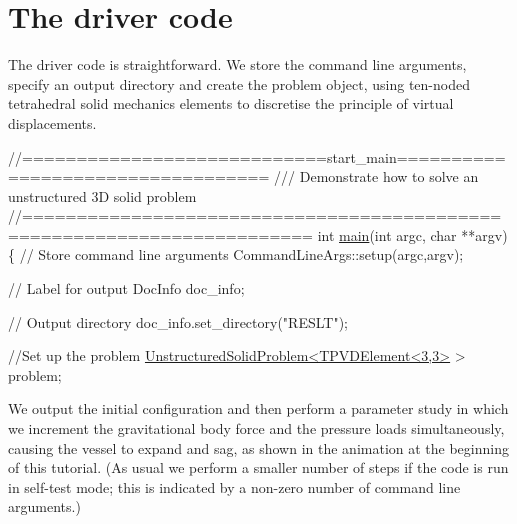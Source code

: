  

\hypertarget{index_main}{}\section{The driver code}\label{index_main}
The driver code is straightforward. We store the command line arguments, specify an output directory and create the problem object, using ten-\/noded tetrahedral solid mechanics elements to discretise the principle of virtual displacements.

 
\begin{DoxyCodeInclude}
\textcolor{comment}{//============================start\_main==================================}
\textcolor{comment}{/// Demonstrate how to solve an unstructured 3D solid problem}
\textcolor{comment}{}\textcolor{comment}{//========================================================================}
\textcolor{keywordtype}{int} \hyperlink{unstructured__three__d__solid_8cc_a3c04138a5bfe5d72780bb7e82a18e627}{main}(\textcolor{keywordtype}{int} argc, \textcolor{keywordtype}{char} **argv)
\{
 \textcolor{comment}{// Store command line arguments}
 CommandLineArgs::setup(argc,argv);
  
 \textcolor{comment}{// Label for output}
 DocInfo doc\_info;
 
 \textcolor{comment}{// Output directory}
 doc\_info.set\_directory(\textcolor{stringliteral}{"RESLT"});
  
 \textcolor{comment}{//Set up the problem}
 \hyperlink{classUnstructuredSolidProblem}{UnstructuredSolidProblem<TPVDElement<3,3>} > problem;

\end{DoxyCodeInclude}


We output the initial configuration and then perform a parameter study in which we increment the gravitational body force and the pressure loads simultaneously, causing the vessel to expand and sag, as shown in the animation at the beginning of this tutorial. (As usual we perform a smaller number of steps if the code is run in self-\/test mode; this is indicated by a non-\/zero number of command line arguments.)


